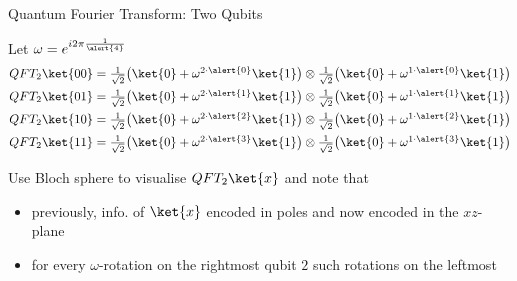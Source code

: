 \documentclass{beamer}
\begin{document}
\begin{frame}{Quantum Fourier Transform: Two Qubits}

        Let $\omega = e^{i 2 \pi \frac{1}{\alert{4}}}$
        \begin{align*}
                QFT_2 \ket{00} & = \textstyle{\frac{1}{\sqrt{2}} \big (\ket{0} 
                + \omega^{2 \cdot \alert{0}} \ket{1} \big )}  \otimes  
                \textstyle{\frac{1}{\sqrt{2}} \big (\ket{0} 
                + \omega^{1 \cdot \alert{0}} \ket{1} \big )}   \\
                QFT_2 \ket{01} & = \textstyle{\frac{1}{\sqrt{2}} \big (\ket{0} 
                + \omega^{2 \cdot \alert{1}} \ket{1} \big )}   \otimes
                \textstyle{\frac{1}{\sqrt{2}} \big (\ket{0} 
                + \omega^{1 \cdot \alert{1}} \ket{1} \big )}  \\
                QFT_2 \ket{10} & = \textstyle{\frac{1}{\sqrt{2}} \big (\ket{0} 
                + \omega^{2 \cdot \alert{2}} \ket{1} \big )}   \otimes
                \textstyle{\frac{1}{\sqrt{2}} \big (\ket{0} 
                + \omega^{1 \cdot \alert{2}} \ket{1} \big )}  \\
                QFT_2 \ket{11} & = \textstyle{\frac{1}{\sqrt{2}} \big (\ket{0} 
                + \omega^{2 \cdot \alert{3}} \ket{1} \big )}   \otimes
                \textstyle{\frac{1}{\sqrt{2}} \big (\ket{0} 
                + \omega^{1 \cdot \alert{3}} \ket{1} \big )} 
        \end{align*}

        \pause
        Use Bloch sphere to visualise $QFT_2 \ket{x}$ and note that 
        \begin{itemize}
               \item previously, info. of $\ket{x}$ encoded in poles and
                       now encoded in the \alert{$xz$-plane}
               \item for every \alert{$\omega$-rotation} on the rightmost 
                       qubit \alert{$2$} such rotations on the leftmost 
        \end{itemize}
\end{frame}
\end{document}
